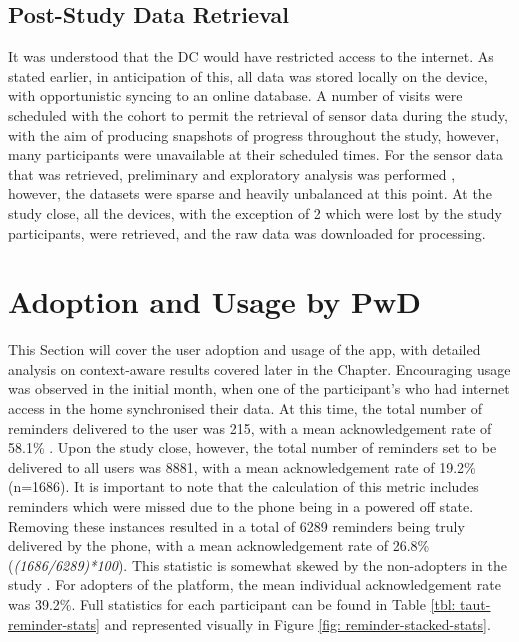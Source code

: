 \subsection{Post-Study Data Retrieval}
It was understood that the DC would have restricted access to the internet. As stated earlier, in anticipation of this, all data was stored locally on the device, with opportunistic syncing to an online database. A number of visits were scheduled with the cohort to permit the retrieval of sensor data during the study, with the aim of producing snapshots of progress throughout the study, however, many participants were unavailable at their scheduled times. For the sensor data that was retrieved, preliminary and exploratory analysis was performed \cite{Hartin2014-WAGER}, however, the datasets were sparse and heavily unbalanced at this point.
At the study close, all the devices, with the exception of 2 which were lost by the study participants, were retrieved, and the raw data was downloaded for processing.

\section{Adoption and Usage by PwD}
This Section will cover the user adoption and usage of the app, with detailed analysis on context-aware results covered later in the Chapter.
Encouraging usage was observed in the initial month, when one of the participant's who had internet access in the home synchronised their data. At this time, the total number of reminders delivered to the user was 215, with a mean acknowledgement rate of 58.1\% \cite{Hartin2014-EMBC}. Upon the study close, however, the total number of reminders set to be delivered to all users was 8881, with a mean acknowledgement rate of 19.2\% (n=1686). It is important to note that the calculation of this metric includes reminders which were missed due to the phone being in a powered off state. Removing these instances resulted in a total of 6289 reminders being truly delivered by the phone, with a mean acknowledgement rate of 26.8\% (\textit{(1686/6289)*100}). This statistic is somewhat skewed by the non-adopters in the study \cite{Cleland2014-IWAAL}. For adopters of the platform, the mean individual acknowledgement rate was 39.2\%. Full statistics for each participant can be found in Table \ref{tbl: taut-reminder-stats} and represented visually in Figure \ref{fig: reminder-stacked-stats}.

